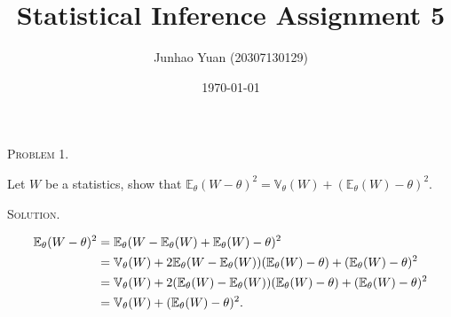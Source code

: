 \documentclass{article}
\title{\textbf{Statistical Inference Assignment 5}}
\author{Junhao Yuan (20307130129)}
\date{\today}
\begin{document}
\begin{CJK}{UTF8}{gbsn}

    \maketitle
    \def \RR{{\mathbb R}}
    \def \EE{{\mathbb E}}
    \def \VV{{\mathbb V}}
    \def \II{{\mathbb I}}

    \newtheorem{lemma}{Lemma}[]

    \begin{shaded}
        \noindent\textsc{Problem 1.}\par
        Let $W$ be a statistics, show that $\EE_{\theta}(W-\theta)^2 = \VV_{\theta}(W) + (\EE_{\theta}(W)- \theta)^2$.
    \end{shaded}
    \noindent\textsc{Solution.}\par
    \begin{align}
        \EE_{\theta} (W - \theta)^2 & = \EE_{\theta}(W - \EE_{\theta}(W) + \EE_{\theta}(W) - \theta)^2 \notag                                                  \\
                                    & = \VV_{\theta}(W) + 2 \EE_{\theta} (W-\EE_{\theta}(W)) (\EE_{\theta}(W) - \theta) + (\EE_{\theta}(W)- \theta)^2 \notag   \\
                                    & = \VV_{\theta}(W) + 2  (\EE_{\theta}(W)-\EE_{\theta}(W)) (\EE_{\theta}(W) - \theta) + (\EE_{\theta}(W)- \theta)^2 \notag \\
                                    & =  \VV_{\theta}(W) + (\EE_{\theta}(W)- \theta)^2.\notag
    \end{align}




\end{CJK}
\end{document}
